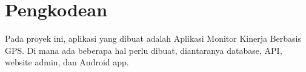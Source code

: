 \section{Pengkodean}
Pada proyek ini, aplikasi yang dibuat adalah Aplikasi Monitor Kinerja Berbasis GPS. Di mana ada beberapa hal perlu dibuat, diantaranya database, API, website admin, dan Android app.



